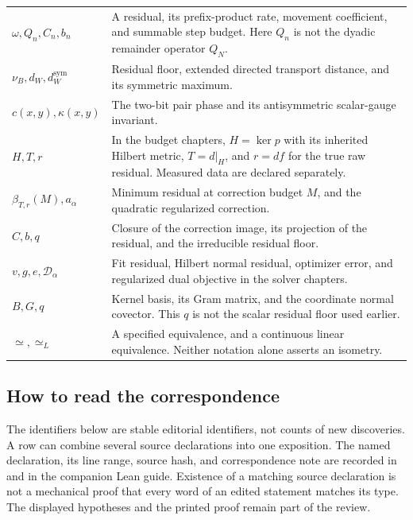 \begin{longtable}{@{}p{.25\linewidth}p{.7\linewidth}@{}}
\(\omega,Q_n,C_n,b_n\) & A residual, its prefix-product rate, movement coefficient, and summable step budget. Here $Q_n$ is not the dyadic remainder operator $Q_N$.\\
\(\nu_B,d_W,d_W^{\mathrm{sym}}\) & Residual floor, extended directed transport distance, and its symmetric maximum.\\
\(c(x,y),\kappa(x,y)\) & The two-bit pair phase and its antisymmetric scalar-gauge invariant.\\
\(H,T,r\) & In the budget chapters, $H=\ker p$ with its inherited Hilbert metric, $T=d|_H$, and $r=df$ for the true raw residual. Measured data are declared separately.\\
\(\beta_{T,r}(M),a_\alpha\) & Minimum residual at correction budget $M$, and the quadratic regularized correction.\\
\(C,b,q\) & Closure of the correction image, its projection of the residual, and the irreducible residual floor.\\
\(v,g,e,\mathcal D_\alpha\) & Fit residual, Hilbert normal residual, optimizer error, and regularized dual objective in the solver chapters.\\
\(B,G,q\) & Kernel basis, its Gram matrix, and the coordinate normal covector. This $q$ is not the scalar residual floor used earlier.\\
\(\simeq,\simeq_L\) & A specified equivalence, and a continuous linear equivalence. Neither notation alone asserts an isometry.\\
\bottomrule
\end{longtable}

\subsection{How to read the correspondence}
The identifiers below are stable editorial identifiers, not counts of new discoveries. A row can combine several source declarations into one exposition. The named declaration, its line range, source hash, and correspondence note are recorded in  and in the companion Lean guide. Existence of a matching source declaration is not a mechanical proof that every word of an edited statement matches its type. The displayed hypotheses and the printed proof remain part of the review.


